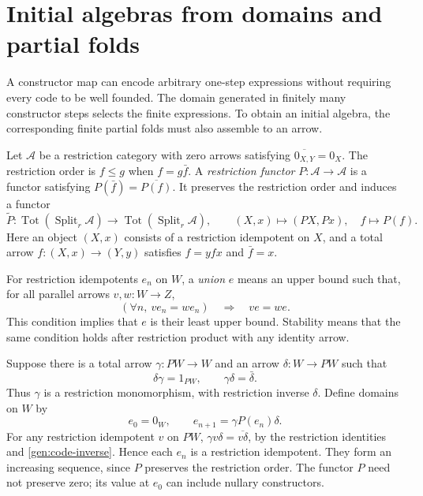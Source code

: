 \documentclass[11pt]{article}
\theoremstyle{definition}
\theoremstyle{remark}
\newcommand{\Tot}{\operatorname{Tot}}
\begin{document}
\section{Initial algebras from domains and partial folds}\label{gen:finite-algebras}

A constructor map can encode arbitrary one-step expressions without
requiring every code to be well founded. The domain generated in finitely
many constructor steps selects the finite expressions. To obtain an
initial algebra, the corresponding finite partial folds must also assemble
to an arrow.

Let $\mathscr A$ be a restriction category with zero arrows satisfying
$\overline{0_{X,Y}}=0_X$. The restriction order is
$f\le g$ when $f=g\bar f$. A \emph{restriction functor}
$P:\mathscr A\to\mathscr A$ is a functor satisfying
$P(\bar f)=\overline{P(f)}$. It preserves the restriction order and
induces a functor
\[
 \widetilde P:\Tot(\operatorname{Split}_r\mathscr A)
 \longrightarrow\Tot(\operatorname{Split}_r\mathscr A),
 \qquad (X,x)\longmapsto(PX,Px),\quad f\longmapsto P(f).
\]
Here an object $(X,x)$ consists of a restriction idempotent on $X$,
and a total arrow $f:(X,x)\to(Y,y)$ satisfies
$f=yfx$ and $\bar f=x$.

For restriction idempotents $e_n$ on $W$, a \emph{union} $e$ means an
upper bound such that, for all parallel arrows $v,w:W\to Z$,
\[
 (\forall n,\ ve_n=we_n)\quad\Longrightarrow\quad ve=we.
\]
This condition implies that $e$ is their least upper bound. Stability
means that the same condition holds after restriction product with any
identity arrow.

Suppose there is a total arrow $\gamma:PW\to W$ and an arrow
$\delta:W\to PW$ such that
\begin{equation}\label{gen:code-inverse}
 \delta\gamma=1_{PW},\qquad
 \gamma\delta=\bar\delta.
\end{equation}
Thus $\gamma$ is a restriction monomorphism, with restriction inverse
$\delta$. Define domains on $W$ by
\begin{equation}\label{gen:finite-stages}
 e_0=0_W,\qquad e_{n+1}=\gamma P(e_n)\delta.
\end{equation}
For any restriction idempotent $v$ on $PW$,
$\gamma v\delta=\overline{v\delta}$, by the restriction identities
and \eqref{gen:code-inverse}. Hence each $e_n$ is a restriction
idempotent. They form an increasing sequence, since $P$ preserves the
restriction order. The functor $P$ need not preserve zero; its value at
$e_0$ can include nullary constructors.
\end{document}
